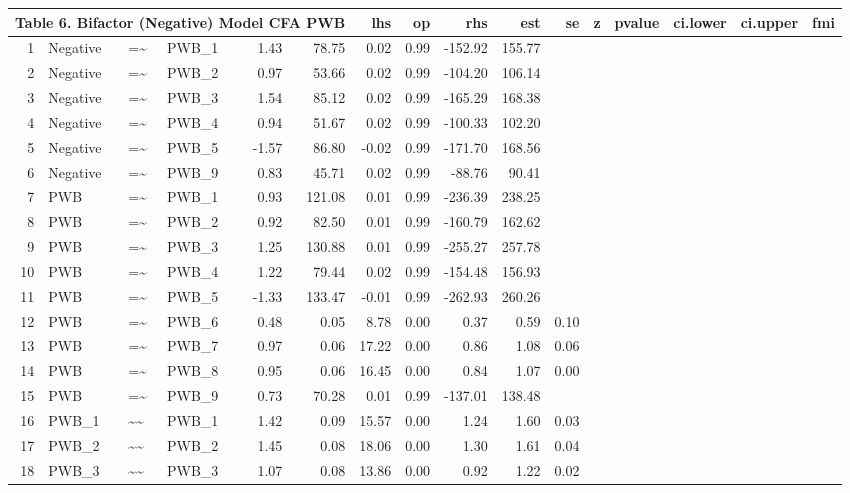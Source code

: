 \documentclass{article}
\begin{document}
\begin{table}[ht]
\centering
\begin{tabular}{rlllrrrrrrr}
 \multicolumn{ 6 }{l}{ Table 6. Bifactor (Negative) Model CFA PWB} \cr 
  \hline
 & lhs & op & rhs & est & se & z & pvalue & ci.lower & ci.upper & fmi \\ 
  \hline
1 & Negative & =\~{} & PWB\_1 & 1.43 & 78.75 & 0.02 & 0.99 & -152.92 & 155.77 &  \\ 
  2 & Negative & =\~{} & PWB\_2 & 0.97 & 53.66 & 0.02 & 0.99 & -104.20 & 106.14 &  \\ 
  3 & Negative & =\~{} & PWB\_3 & 1.54 & 85.12 & 0.02 & 0.99 & -165.29 & 168.38 &  \\ 
  4 & Negative & =\~{} & PWB\_4 & 0.94 & 51.67 & 0.02 & 0.99 & -100.33 & 102.20 &  \\ 
  5 & Negative & =\~{} & PWB\_5 & -1.57 & 86.80 & -0.02 & 0.99 & -171.70 & 168.56 &  \\ 
  6 & Negative & =\~{} & PWB\_9 & 0.83 & 45.71 & 0.02 & 0.99 & -88.76 & 90.41 &  \\ 
  7 & PWB & =\~{} & PWB\_1 & 0.93 & 121.08 & 0.01 & 0.99 & -236.39 & 238.25 &  \\ 
  8 & PWB & =\~{} & PWB\_2 & 0.92 & 82.50 & 0.01 & 0.99 & -160.79 & 162.62 &  \\ 
  9 & PWB & =\~{} & PWB\_3 & 1.25 & 130.88 & 0.01 & 0.99 & -255.27 & 257.78 &  \\ 
  10 & PWB & =\~{} & PWB\_4 & 1.22 & 79.44 & 0.02 & 0.99 & -154.48 & 156.93 &  \\ 
  11 & PWB & =\~{} & PWB\_5 & -1.33 & 133.47 & -0.01 & 0.99 & -262.93 & 260.26 &  \\ 
  12 & PWB & =\~{} & PWB\_6 & 0.48 & 0.05 & 8.78 & 0.00 & 0.37 & 0.59 & 0.10 \\ 
  13 & PWB & =\~{} & PWB\_7 & 0.97 & 0.06 & 17.22 & 0.00 & 0.86 & 1.08 & 0.06 \\ 
  14 & PWB & =\~{} & PWB\_8 & 0.95 & 0.06 & 16.45 & 0.00 & 0.84 & 1.07 & 0.00 \\ 
  15 & PWB & =\~{} & PWB\_9 & 0.73 & 70.28 & 0.01 & 0.99 & -137.01 & 138.48 &  \\ 
  16 & PWB\_1 & \~{}\~{} & PWB\_1 & 1.42 & 0.09 & 15.57 & 0.00 & 1.24 & 1.60 & 0.03 \\ 
  17 & PWB\_2 & \~{}\~{} & PWB\_2 & 1.45 & 0.08 & 18.06 & 0.00 & 1.30 & 1.61 & 0.04 \\ 
  18 & PWB\_3 & \~{}\~{} & PWB\_3 & 1.07 & 0.08 & 13.86 & 0.00 & 0.92 & 1.22 & 0.02 \\ 

\end{tabular}
\end{table}
\end{document}
